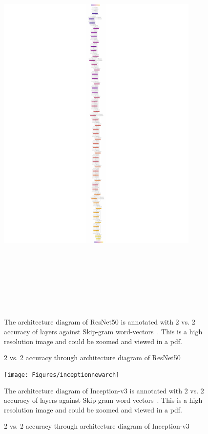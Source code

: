 \newpage
\begin{figure}[!hb]
\centering
\includegraphics[width=10cm, height=20cm]{Figures/resnetnewarch}
\caption{2 vs. 2 accuracy through architecture diagram of ResNet50}
\label{RESARCH}
The architecture diagram of ResNet50 is annotated with 2 vs. 2 accuracy of layers against Skip-gram word-vectors~\cite{ResNet}. This is a high resolution image and could be zoomed and viewed in a pdf.
\end{figure}


\newpage
\begin{figure}[!hb]
\centering
\texttt{[image: Figures/inceptionnewarch]}
\caption{2 vs. 2 accuracy through architecture diagram of Inception-v3}
\label{INCARCH}
The architecture diagram of Inception-v3 is annotated with 2 vs. 2 accuracy of layers against Skip-gram word-vectors~\cite{Inception-v3}. This is a high resolution image and could be zoomed and viewed in a pdf.
\end{figure}






